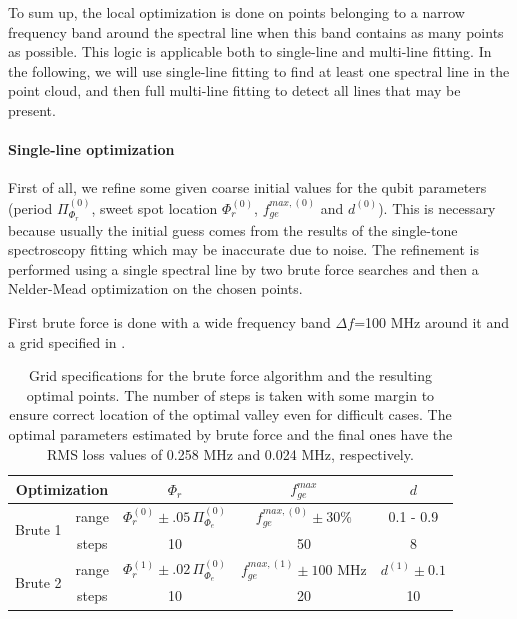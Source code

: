 \documentclass[%
 aip,
 amsmath,amssymb,
 reprint,%
]{revtex4-1}
\begin{document}
To sum up, the local optimization is done on points belonging to a narrow frequency band around the spectral line when this band contains as many points as possible. This logic is applicable both to single-line and multi-line fitting. In the following, we will use single-line fitting to find at least one spectral line in the point cloud, and then full multi-line fitting to detect all lines that may be present.


\paragraph{Single-line optimization}

First of all, we refine some given coarse initial values for the qubit parameters (period $\Pi_{\Phi_r}^{(0)}$, sweet spot location $\Phi_r^{(0)}$, $f_{ge}^{max, (0)}$ and $d^{(0)}$). This is necessary because usually the initial guess comes from the results of the single-tone spectroscopy fitting which may be inaccurate due to noise. The refinement is performed using a single spectral line by two brute force searches and then a Nelder-Mead optimization on the chosen points. 

First brute force is done with a wide frequency band $\Delta f$=100 MHz around it and a grid specified in .

\begin{table}
	\centering
	\begin{ruledtabular}
		\begin{tabular}{*5c} 
			\multicolumn{2}{c}{Optimization} & $\Phi_r$ & $f_{ge}^{max}$ &  	$d$\\
			\hline
			\multirow{2}{*}{Brute 1} & range & $\Phi_r^{(0)}\pm .05\, \Pi_{\Phi_e}^{(0)}$ & $f_{ge}^{max, (0)}\pm 30\%$ & 0.1 - 0.9  \\
			&steps & 10& 50& 8\\
			\multirow{2}{*}{Brute 2} & range & $\Phi_r^{(1)}\pm .02\, \Pi_{\Phi_e}^{(0)}$ & $f_{ge}^{max, (1)}\pm 100$ MHz & $d^{(1)}\pm 0.1$ \\
			& steps & 10 & 20 & 10
		\end{tabular}
	 
\end{ruledtabular}
	\caption{Grid specifications for the brute force algorithm and the resulting optimal points. The number of steps is taken with some margin to ensure correct location of the optimal valley even for difficult cases. The optimal parameters estimated by brute force and the final ones have the RMS loss values of 0.258 MHz and 0.024 MHz, respectively.}
	\label{tab:grid_tts}
\end{table}
\end{document}
